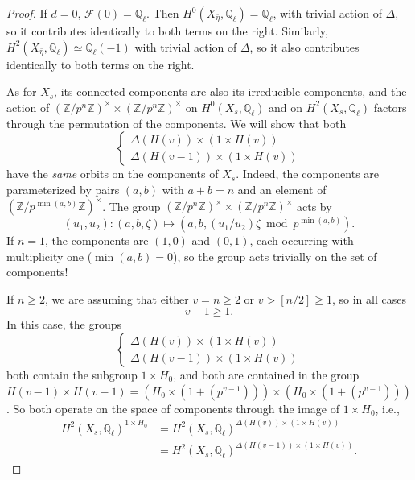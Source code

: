 \begin{proof}
If $d = 0$, $\mathcal{F}(0) = \mathbb{Q}_\ell$. Then $H^0(X_{\bar{\eta}}, \mathbb{Q}_\ell) = \mathbb{Q}_\ell$, with trivial action of $\Delta$, so it contributes identically to both terms on the right. Similarly, $H^2(X_{\bar{\eta}}, \mathbb{Q}_\ell) \simeq \mathbb{Q}_\ell(-1)$ with trivial action of $\Delta$, so it also contributes identically to both terms on the right.

As for $X_s$, its connected components are also its irreducible components, and the action of $(\mathbb{Z}/p^n\mathbb{Z})^\times \times (\mathbb{Z}/p^n\mathbb{Z})^\times$ on $H^0(X_s, \mathbb{Q}_\ell)$ and on $H^2(X_s, \mathbb{Q}_\ell)$ factors through the permutation of the components. We will show that both
\begin{equation}\label{eq:14.5.5.5}
\begin{cases}
\Delta(H(v)) \times (1 \times H(v)) \\[4pt]
\Delta(H(v-1)) \times (1 \times H(v))
\end{cases}
\end{equation}
have the \emph{same} orbits on the components of $X_s$. Indeed, the components are parameterized by pairs $(a,b)$ with $a+b=n$ and an element of $(\mathbb{Z}/p^{\min(a,b)}\mathbb{Z})^\times$. The group $(\mathbb{Z}/p^n\mathbb{Z})^\times \times (\mathbb{Z}/p^n\mathbb{Z})^\times$ acts by
\begin{equation}\label{eq:14.5.5.6}
(u_1, u_2) : (a,b, \zeta) \mapsto (a,b, (u_1/u_2) \zeta \bmod p^{\min(a,b)}) .
\end{equation}
If $n = 1$, the components are $(1,0)$ and $(0,1)$, each occurring with multiplicity one ($\min(a,b) = 0$), so the group acts trivially on the set of components!

If $n \ge 2$, we are assuming that either $v = n \ge 2$ or $v > [n/2] \ge 1$, so in all cases
\[
v-1 \ge 1 .
\]
In this case, the groups
\[
\begin{cases}
\Delta(H(v)) \times (1 \times H(v)) \\[4pt]
\Delta(H(v-1)) \times (1 \times H(v))
\end{cases}
\]
both contain the subgroup $1 \times H_0$, and both are contained in the group $H(v-1) \times H(v-1) = (H_0 \times (1+(p^{v-1}))) \times (H_0 \times (1+(p^{v-1})))$. So both operate on the space of components through the image of $1 \times H_0$, i.e.,
\begin{equation}\label{eq:14.5.5.7}
\begin{aligned}
H^2(X_s, \mathbb{Q}_\ell)^{1 \times H_0} &= H^2(X_s, \mathbb{Q}_\ell)^{\Delta(H(v)) \times (1 \times H(v))} \\
&= H^2(X_s, \mathbb{Q}_\ell)^{\Delta(H(v-1)) \times (1 \times H(v))} .
\end{aligned}
\end{equation}


\end{proof}
